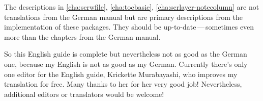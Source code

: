 The descriptions in \autoref{cha:scrwfile}, \autoref{cha:tocbasic},
\autoref{cha:scrlayer-notecolumn} are not translations from the German manual
but are primary descriptions from the implementation of these packages. They
should be up-to-date\,---\,sometimes even more than the chapters from the
German manual.

So this English guide is complete but nevertheless not as good as the German
one, because my English is not as good as my German. Currently there's only
one editor for the English guide, Krickette Murabayashi, who improves my
translation for free. Many thanks to her for her very good job! Nevertheless,
additional editors or translators would be welcome!

\endinput


